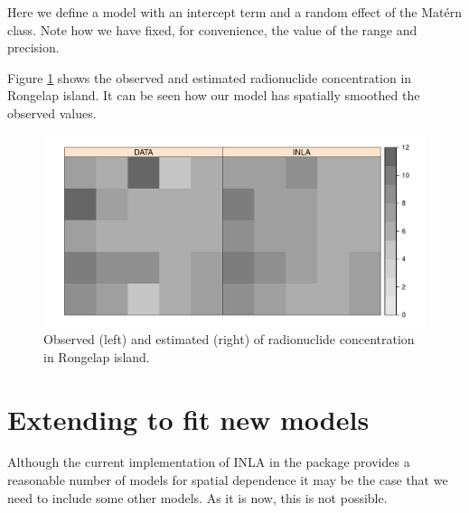 \documentclass[article]{jss}
\begin{document}
Here we define a model with an intercept term and a random effect of the
Mat\'ern class. Note how we have fixed, for convenience, 
the value of the range and precision.

\begin{Schunk}
\end{Schunk}

Figure \ref{fig:geos} shows the observed and estimated radionuclide
concentration in Rongelap island. It can be seen how our model has spatially
smoothed the observed values.

\begin{figure}[h]
\begin{center}
\includegraphics{spatial_inla-012}
\caption{Observed (left) and estimated (right) of radionuclide concentration
in Rongelap island.}
\label{fig:geos}
\end{center}
\end{figure}



\section[Extending {R-INLA} to fit new models]{Extending  to fit new models} 

\label{sec:extINLA}


Although the current implementation of INLA in the  package
provides a reasonable number of models for spatial dependence it may be the
case that we need to include some other models. As it is now, this is not
possible.
\end{document}
